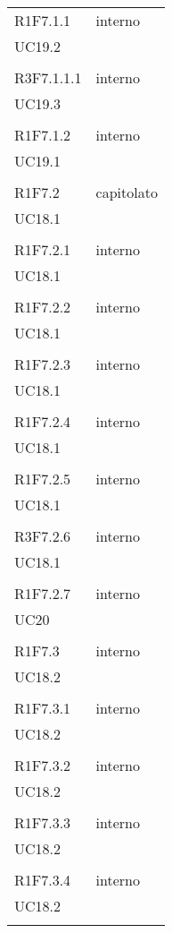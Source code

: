 \begin{longtable}{ >{\centering}p{}
		>{\centering}p{}}
	R1F7.1.1 & interno\\UC19.2\\\tabularnewline
	
	R3F7.1.1.1 & interno\\UC19.3\\\tabularnewline
	
	R1F7.1.2 & interno\\UC19.1\\\tabularnewline
	
	R1F7.2 & capitolato\\UC18.1\\\tabularnewline
	
	R1F7.2.1 & interno\\UC18.1\\\tabularnewline
	
	R1F7.2.2 & interno\\UC18.1\\\tabularnewline
	
	R1F7.2.3 & interno\\UC18.1\\\tabularnewline
	
	R1F7.2.4 & interno\\UC18.1\\\tabularnewline
	
	R1F7.2.5 & interno\\UC18.1\\\tabularnewline
	
	R3F7.2.6 & interno\\UC18.1\\\tabularnewline
	
	R1F7.2.7 & interno\\UC20\\\tabularnewline
	
	R1F7.3 & interno\\UC18.2\\\tabularnewline
	
	R1F7.3.1 & interno\\UC18.2\\\tabularnewline
	
	R1F7.3.2 & interno\\UC18.2\\\tabularnewline
	
	R1F7.3.3 & interno\\UC18.2\\\tabularnewline
	
	R1F7.3.4 & interno\\UC18.2\\\tabularnewline
	

\end{longtable}

